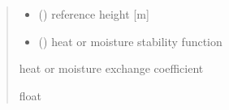 \documentclass[letterpaper,10pt,english]{sphinxmanual}
\begin{document}
\begin{fulllineitems}
\begin{quote}
\begin{description}
\begin{itemize}
\item {} 
\sphinxAtStartPar
{} () \textendash{} reference height                   {[}m{]}

\item {} 
\sphinxAtStartPar
{} () \textendash{} heat or moisture stability function

\end{itemize}

\sphinxAtStartPar
{} \textendash{} heat or moisture exchange coefficient

\sphinxAtStartPar
float

\end{description}\end{quote}

\end{fulllineitems}

\end{document}
